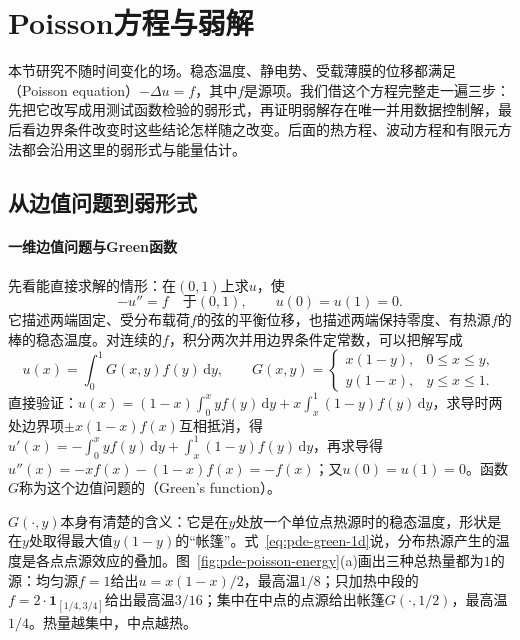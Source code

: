 
\section{Poisson方程与弱解}
\label{sec:pde-poisson}

本节研究不随时间变化的场。稳态温度、静电势、受载薄膜的位移都满足（Poisson equation）$-\Delta u=f$，其中$f$是源项。我们借这个方程完整走一遍三步：先把它改写成用测试函数检验的弱形式，再证明弱解存在唯一并用数据控制解，最后看边界条件改变时这些结论怎样随之改变。后面的热方程、波动方程和有限元方法都会沿用这里的弱形式与能量估计。

\subsection{从边值问题到弱形式}
\label{sec:pde-weak-form}

\paragraph{一维边值问题与Green函数}
先看能直接求解的情形：在$(0,1)$上求$u$，使
\begin{equation}
  -u''=f\quad\text{于}(0,1),\qquad u(0)=u(1)=0 .
  \label{eq:pde-poisson-1d}
\end{equation}
它描述两端固定、受分布载荷$f$的弦的平衡位移，也描述两端保持零度、有热源$f$的棒的稳态温度。对连续的$f$，积分两次并用边界条件定常数，可以把解写成
\begin{equation}
  u(x)=\int_0^1G(x,y)f(y)\,\mathrm dy,\qquad
  G(x,y)=\begin{cases}x(1-y),&0\leq x\leq y,\\ y(1-x),&y\leq x\leq1 .\end{cases}
  \label{eq:pde-green-1d}
\end{equation}
直接验证：$u(x)=(1-x)\int_0^xyf(y)\,\mathrm dy+x\int_x^1(1-y)f(y)\,\mathrm dy$，求导时两处边界项$\pm x(1-x)f(x)$互相抵消，得$u'(x)=-\int_0^xyf(y)\,\mathrm dy+\int_x^1(1-y)f(y)\,\mathrm dy$，再求导得$u''(x)=-xf(x)-(1-x)f(x)=-f(x)$；又$u(0)=u(1)=0$。函数$G$称为这个边值问题的（Green's function）。

$G(\cdot,y)$本身有清楚的含义：它是在$y$处放一个单位点热源时的稳态温度，形状是在$y$处取得最大值$y(1-y)$的“帐篷”。式~\eqref{eq:pde-green-1d}说，分布热源产生的温度是各点点源效应的叠加。图~\ref{fig:pde-poisson-energy}(a)画出三种总热量都为$1$的源：均匀源$f=1$给出$u=x(1-x)/2$，最高温$1/8$；只加热中段的$f=2\cdot\mathbf 1_{[1/4,3/4]}$给出最高温$3/16$；集中在中点的点源给出帐篷$G(\cdot,1/2)$，最高温$1/4$。热量越集中，中点越热。

